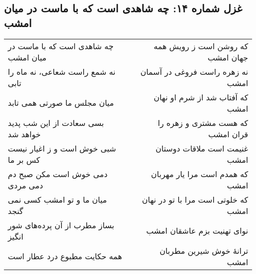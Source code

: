 \begin{center}
\section*{غزل شماره ۱۴: چه شاهدی است که با ماست در میان امشب}
\label{sec:014}
\begin{longtable}{l p{0.5cm} r}
چه شاهدی است که با ماست در میان امشب
&&
که روشن است ز رویش همه جهان امشب
\\
نه شمع راست شعاعی، نه ماه را تابی
&&
نه زهره راست فروغی در آسمان امشب
\\
میان مجلس ما صورتی همی تابد
&&
که آفتاب شد از شرم او نهان امشب
\\
بسی سعادت از این شب پدید خواهد شد
&&
که هست مشتری و زهره را قران امشب
\\
شبی خوش است و ز اغیار نیست کس بر ما
&&
غنیمت است ملاقات دوستان امشب
\\
دمی خوش است مکن صبح دم دمی مردی
&&
که همدم است مرا یار مهربان امشب
\\
میان ما و تو امشب کسی نمی گنجد
&&
که خلوتی است مرا با تو در نهان امشب
\\
بساز مطرب از آن پرده‌های شور انگیز
&&
نوای تهنیت بزم عاشقان امشب
\\
همه حکایت مطبوع درد عطار است
&&
ترانهٔ خوش شیرین مطربان امشب
\\
\end{longtable}
\end{center}
